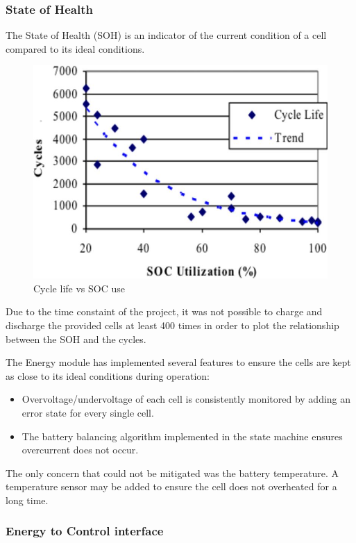 \documentclass[11pt, a4paper]{article}
\begin{document}
\subsubsection{State of Health}

The State of Health (SOH) is an indicator of the current condition of a cell compared to its ideal conditions. 
\begin{figure} [h!]
    \centering
    \includegraphics[scale=0.4]{Energy_SOH.JPG}
    \caption{Cycle life vs SOC use \cite{SOH}}
\end{figure}

Due to the time constaint of the project, it was not possible to charge and discharge the provided cells at least 400 times in order to plot the relationship between the SOH and the cycles. 

The Energy module has implemented several features to ensure the cells are kept as close to its ideal conditions during operation:
\begin{itemize}
    \item Overvoltage/undervoltage of each cell is consistently monitored by adding an error state for every single cell.
    \item The battery balancing algorithm implemented in the state machine ensures overcurrent does not occur.
\end{itemize}

The only concern that could not be mitigated was the battery temperature. A temperature sensor may be added to ensure the cell does not overheated for a long time.  

\pagebreak
\subsubsection{Energy to Control interface}
\end{document}
